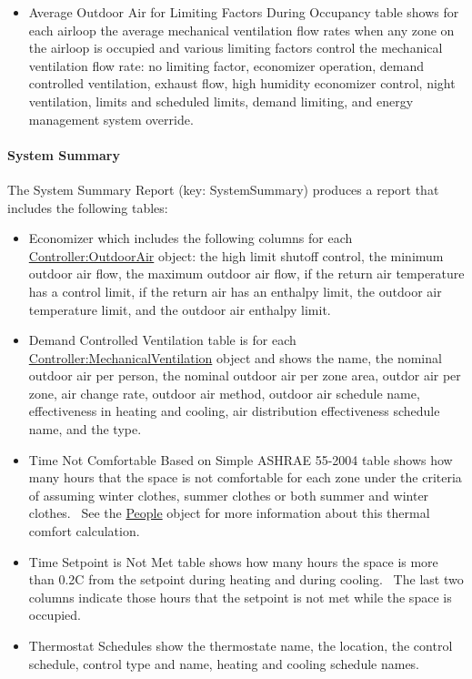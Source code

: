 \begin{itemize}
\item
  Average Outdoor Air for Limiting Factors During Occupancy table shows for each airloop the average mechanical ventilation flow rates when any zone on the airloop is occupied and various limiting factors control the mechanical ventilation flow rate: no limiting factor, economizer operation, demand controlled ventilation, exhaust flow, high humidity economizer control, night ventilation, limits and scheduled limits, demand limiting, and energy management system override.
\end{itemize}

\paragraph{System Summary}\label{system-summary}

The System Summary Report (key: SystemSummary) produces a report that includes the following tables:

\begin{itemize}
\item
  Economizer which includes the following columns for each \hyperref[controlleroutdoorair]{Controller:OutdoorAir} object: the high limit shutoff control, the minimum outdoor air flow, the maximum outdoor air flow, if the return air temperature has a control limit, if the return air has an enthalpy limit, the outdoor air temperature limit, and the outdoor air enthalpy limit.
\item
  Demand Controlled Ventilation table is for each \hyperref[controllermechanicalventilation]{Controller:MechanicalVentilation} object and shows the name, the nominal outdoor air per person, the nominal outdoor air per zone area, outdor air per zone, air change rate, outdoor air method, outdoor air schedule name, effectiveness in heating and cooling, air distribution effectiveness schedule name, and the type.
\item
  Time Not Comfortable Based on Simple ASHRAE 55-2004 table shows how many hours that the space is not comfortable for each zone under the criteria of assuming winter clothes, summer clothes or both summer and winter clothes.~ See the \hyperref[people]{People} object for more information about this thermal comfort calculation.
\item
  Time Setpoint is Not Met table shows how many hours the space is more than 0.2C from the setpoint during heating and during cooling.~ The last two columns indicate those hours that the setpoint is not met while the space is occupied.
\item
  Thermostat Schedules show the thermostate name, the location, the control schedule, control type and name, heating and cooling schedule names.
\end{itemize}

